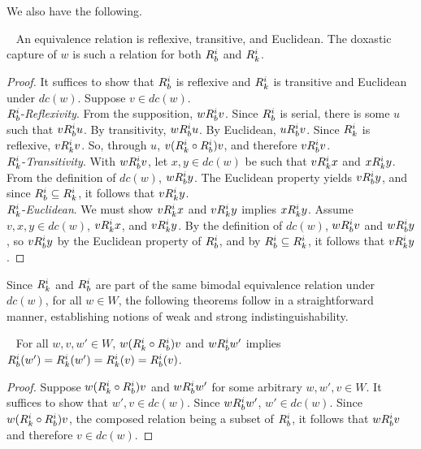 We also have the following.

\begin{theorem}~\label{dc_equiv}
	An equivalence relation is reflexive, transitive, and Euclidean. The doxastic capture of $w$ is such a relation for both $R_{b}^i$ and $R_{k}^i$.
\end{theorem}
\begin{proof}
	It suffices to show that $R_{b}^i$ is reflexive and $R_{k}^i$ is transitive and Euclidean under $dc(w)$. Suppose $v\in dc(w)$.\\ 
	$R_{b}^i$-\emph{Reflexivity}. From the supposition, $wR_{b}^iv$. Since $R_{b}^i$ is serial, there is some $u$ such that $vR_{b}^iu$. By transitivity, $wR_{b}^iu$. By Euclidean, $uR_{b}^iv$. Since $R_{k}^i$ is reflexive, $vR_{k}^iv$. So, through $u$, $v(R_{k}^i \circ R_{b}^i)v$, and therefore $vR_{b}^iv$.\\
	$R_{k}^i$-\emph{Transitivity}. With $wR_{b}^iv$, let $x,y \in dc(w)$ be such that $vR_{k}^ix$ and $xR_{k}^iy$. From the definition of $dc(w)$, $wR_{b}^iy$. The Euclidean property yields $vR_{b}^iy$, and since $R_{b}^i\subseteq R_{k}^i$, it follows that $vR_{k}^iy$.\\
	$R_{k}^i$-\emph{Euclidean}. We must show $vR_{k}^ix$ and $vR_{k}^iy$ implies $xR_{k}^iy$. Assume $v,x,y \in dc(w)$, $vR_{k}^ix$, and $vR_{k}^iy$. By the definition of $dc(w)$, $wR_{b}^iv$ and $wR_{b}^iy$, so $vR_{b}^iy$ by the Euclidean property of $R_{b}^i$, and by $R_{b}^i \subseteq R_{k}^i$, it follows that $vR_{k}^iy$.
\end{proof}

Since $R_{k}^i$ and $R_{b}^i$ are part of the same bimodal equivalence relation under $dc(w)$, for all $w\in W$, the following theorems follow in a straightforward manner, establishing notions of weak and strong indistinguishability.

\begin{theorem}~\label{weak_equiv}
	For all $w,v,w' \in W$, $w(R_{k}^i \circ R_{b}^i)v$ and $wR_{b}^iw'$ implies $R_{b}^i(w') = R_{k}^i(w') = R_{k}^i(v) = R_{b}^i(v)$.
\end{theorem}
\begin{proof}
	Suppose $w(R_{k}^i \circ R_{b}^i)v$ and $wR_{b}^iw'$ for some arbitrary $w,w',v\in W$. It suffices to show that $w',v \in dc(w)$. Since $wR_{b}^iw'$, $w'\in dc(w)$. Since $w(R_{k}^i \circ R_{b}^i)v$, the composed relation being a subset of $R_{b}^i$, it follows that $wR_{b}^iv$ and therefore $v \in dc(w)$.
\end{proof}

